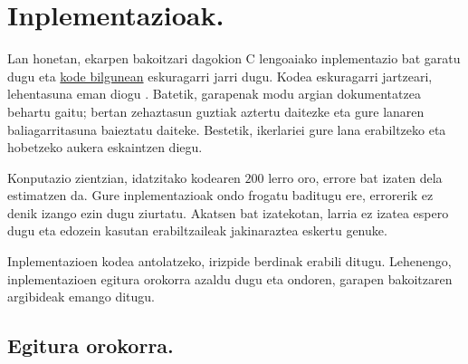 \chapter{Inplementazioak.}

Lan honetan, ekarpen bakoitzari dagokion C lengoaiako inplementazio bat garatu dugu eta \href{https://github.com/mikelehu/}{kode bilgunean} eskuragarri jarri dugu. Kodea eskuragarri jartzeari, lehentasuna eman diogu \cite{Atmanspacher2016,Wilson2014}. Batetik, garapenak modu argian dokumentatzea behartu gaitu; bertan zehaztasun guztiak aztertu daitezke eta gure lanaren baliagarritasuna baieztatu daiteke. Bestetik, ikerlariei gure lana erabiltzeko eta hobetzeko aukera eskaintzen diegu.

Konputazio zientzian, idatzitako kodearen $200$ lerro oro, errore bat izaten dela \cite{Frenkel2001} estimatzen da. Gure inplementazioak ondo frogatu baditugu ere, errorerik ez denik izango ezin dugu ziurtatu. Akatsen bat izatekotan, larria ez izatea espero dugu eta edozein kasutan  erabiltzaileak jakinaraztea eskertu genuke.   

Inplementazioen kodea antolatzeko, irizpide berdinak erabili ditugu. Lehenengo, inplementazioen egitura orokorra azaldu dugu eta ondoren, garapen bakoitzaren argibideak emango ditugu.      

\section{Egitura orokorra.}

